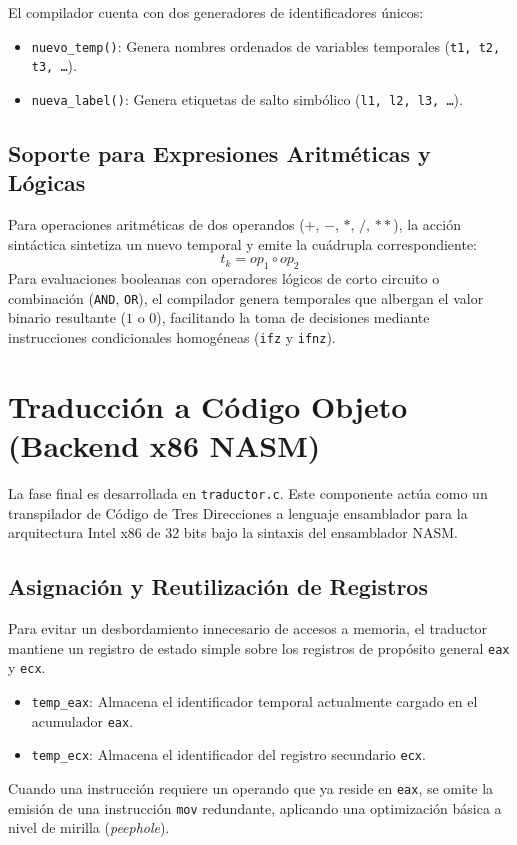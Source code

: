 \documentclass[conference]{IEEEtran}
\begin{document}
El compilador cuenta con dos generadores de identificadores únicos:
\begin{itemize}
    \item \texttt{nuevo\_temp()}: Genera nombres ordenados de variables temporales (\texttt{t1, t2, t3, \dots}).
    \item \texttt{nueva\_label()}: Genera etiquetas de salto simbólico (\texttt{l1, l2, l3, \dots}).
\end{itemize}

\subsection{Soporte para Expresiones Aritméticas y Lógicas}
Para operaciones aritméticas de dos operandos ($+$, $-$, $*$, $/$, $**$), la acción sintáctica sintetiza un nuevo temporal y emite la cuádrupla correspondiente:
\begin{equation}
t_k = op_1 \circ op_2
\end{equation}
Para evaluaciones booleanas con operadores lógicos de corto circuito o combinación (\texttt{AND}, \texttt{OR}), el compilador genera temporales que albergan el valor binario resultante ($1$ o $0$), facilitando la toma de decisiones mediante instrucciones condicionales homogéneas (\texttt{ifz} y \texttt{ifnz}).

\section{Traducción a Código Objeto (Backend x86 NASM)}
La fase final es desarrollada en \texttt{traductor.c}. Este componente actúa como un transpilador de Código de Tres Direcciones a lenguaje ensamblador para la arquitectura Intel x86 de 32 bits bajo la sintaxis del ensamblador NASM.

\subsection{Asignación y Reutilización de Registros}
Para evitar un desbordamiento innecesario de accesos a memoria, el traductor mantiene un registro de estado simple sobre los registros de propósito general \texttt{eax} y \texttt{ecx}. 
\begin{itemize}
    \item \texttt{temp\_eax}: Almacena el identificador temporal actualmente cargado en el acumulador \texttt{eax}.
    \item \texttt{temp\_ecx}: Almacena el identificador del registro secundario \texttt{ecx}.
\end{itemize}
Cuando una instrucción requiere un operando que ya reside en \texttt{eax}, se omite la emisión de una instrucción \texttt{mov} redundante, aplicando una optimización básica a nivel de mirilla (\textit{peephole}).
\end{document}
